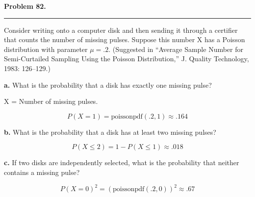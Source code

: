 \textbf{Problem 82.} \\
\hrule 

Consider writing onto a computer disk and then sending it through a certifier that counts the number of missing pulses. Suppose this number X has a Poisson distribution with parameter $\mu = .2$. (Suggested in “Average Sample Number for Semi-Curtailed Sampling Using the Poisson Distribution,” J. Quality Technology, 1983: 126–129.)

\textbf{a.} What is the probability that a disk has exactly one
missing pulse?

X = Number of missing pulses.

\[P(X = 1) = \text{poissonpdf}(.2,1) \approx \boxed{.164}\]

\textbf{b.} What is the probability that a disk has at least two
missing pulses?

\[P(X \leq 2) = 1 - P(X \leq 1) \approx \boxed{.018}\]

\textbf{c.} If two disks are independently selected, what is the probability that neither contains a missing pulse?

\[P(X = 0)^2 = (\text{poissonpdf}(.2,0))^2 \approx \boxed{.67}\]